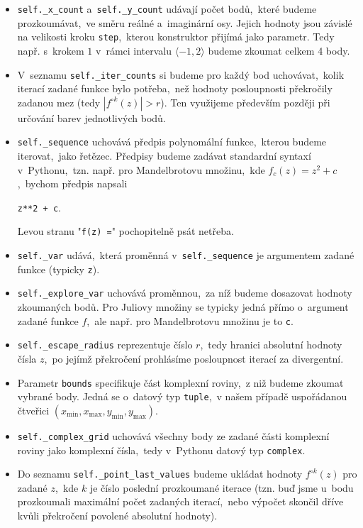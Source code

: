 \begin{itemize}
    \item \texttt{self.\_x\_count} a~\texttt{self.\_y\_count} udávají počet bodů,~které budeme prozkoumávat,~ve směru reálné a~imaginární osy. Jejich hodnoty jsou závislé na velikosti kroku \texttt{step},~kterou konstruktor přijímá jako parametr. Tedy např. s~krokem $1$ v~rámci intervalu $\langle-1,2\rangle$ budeme zkoumat celkem 4 body.
    \item V~seznamu \texttt{self.\_iter\_counts} si budeme pro každý bod uchovávat,~kolik iterací zadané funkce bylo potřeba,~než hodnoty posloupnosti překročily zadanou mez (tedy $|f^{\circ k}(z)|>r$). Ten využijeme především později při určování barev jednotlivých bodů.
    \item \texttt{self.\_sequence} uchovává předpis polynomální funkce,~kterou budeme iterovat,~jako řetězec. Předpisy budeme zadávat standardní syntaxí v~Pythonu,~tzn. např. pro Mandelbrotovu množinu,~kde $f_c(z)=z^2+c$,~bychom předpis napsali
    \begin{center}
        \texttt{z**2 + c}.
    \end{center}
    Levou stranu "\texttt{f(z) =}" pochopitelně psát netřeba.
    \item \texttt{self.\_var} udává,~která proměnná v~\texttt{self.\_sequence} je argumentem zadané funkce (typicky \texttt{z}).
    \item \texttt{self.\_explore\_var} uchovává proměnnou,~za níž budeme dosazovat hodnoty zkoumaných bodů. Pro Juliovy množiny se typicky jedná přímo o~argument zadané funkce $f$,~ale např. pro Mandelbrotovu množinu je to \texttt{c}.
    \item \texttt{self.\_escape\_radius} reprezentuje číslo $r$,~tedy hranici absolutní hodnoty čísla $z$,~po jejímž překročení prohlásíme posloupnost iterací za divergentní.
    \item Parametr \texttt{bounds} specifikuje část komplexní roviny,~z niž budeme zkoumat vybrané body. Jedná se o~datový typ \texttt{tuple},~v našem případě uspořádanou čtveřici $(x_{\text{min}},x_{\text{max}},y_{\text{min}},y_{\text{max}})$.
    \item \texttt{self.\_complex\_grid} uchovává všechny body ze zadané části komplexní roviny jako komplexní čísla,~tedy v~Pythonu datový typ \texttt{complex}.
    \item Do seznamu \texttt{self.\_point\_last\_values} budeme ukládat hodnoty $f^{\circ k}(z)$ pro zadané $z$,~kde $k$ je číslo poslední prozkoumané iterace (tzn. buď jsme u~bodu prozkoumali maximální počet zadaných iterací,~nebo výpočet skončil dříve kvůli překročení povolené absolutní hodnoty).
\end{itemize}
